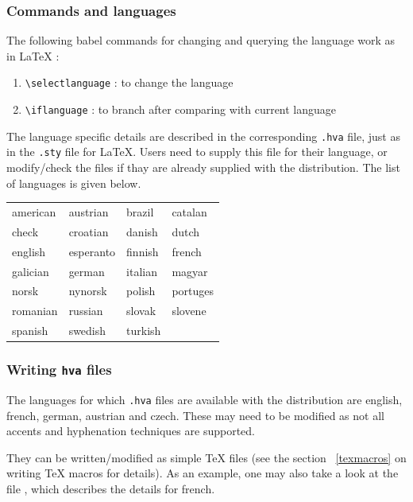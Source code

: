 \subsubsection{Commands and languages}
The following babel commands for changing and querying the language work as in \LaTeX{} :
\begin{enumerate}
\item {\verb+\selectlanguage+ : to change the language}
\item {\verb+\iflanguage+ : to branch after comparing with current language}
\end{enumerate}  

The language specific details are described in the corresponding
\verb+.hva+ file, just as in the \verb+.sty+ file for \LaTeX. Users
need to supply this file for their language, or modify/check the files
if thay are already supplied with the distribution. The list of
languages is given below.

\begin{center}
\begin{tabular}{|l|l|l|l|}
\hline
american & austrian & brazil & catalan \\
check & croatian & danish & dutch \\
english & esperanto & finnish & french \\
galician & german & italian & magyar \\
norsk & nynorsk & polish & portuges \\
romanian & russian & slovak & slovene \\
spanish & swedish & turkish & \\
\hline
\end{tabular}
\end{center}

\subsubsection{Writing \texttt{hva} files}

The languages for which {\tt .hva} files are available with the
distribution are english, french, german, austrian and czech. These
may need to be modified as not all accents and hyphenation techniques
are supported.

They can be written/modified as simple \TeX{} files (see the section ~\ref{texmacros} on writing \TeX{} macros for details). As an example, one may also take a look at the file , which describes the details for french. 

